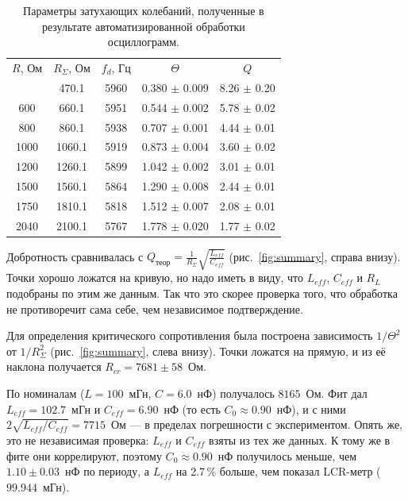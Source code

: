 \documentclass[reprint, amsmath, amssymb, aps, pra, nofootinbib]{revtex4-2}
\begin{document}
\begin{table}[b!]
    \caption{Параметры затухающих колебаний, полученные в результате автоматизированной обработки осциллограмм.}
    \label{tab:auto_results}
    \begin{ruledtabular}
        \begin{tabular}{ccccc}
            $R$, Ом & $R_\Sigma$, Ом & $f_d$, Гц & $\Theta$ & $Q$ \\
            \colrule
            410  & 470.1  & 5960 & 0.380 $\pm$ 0.009 & 8.26 $\pm$ 0.20 \\
            600  & 660.1  & 5951 & 0.544 $\pm$ 0.002 & 5.78 $\pm$ 0.02 \\
            800  & 860.1  & 5938 & 0.707 $\pm$ 0.001 & 4.44 $\pm$ 0.01 \\
            1000 & 1060.1 & 5919 & 0.873 $\pm$ 0.004 & 3.60 $\pm$ 0.02 \\
            1200 & 1260.1 & 5899 & 1.042 $\pm$ 0.002 & 3.01 $\pm$ 0.01 \\
            1500 & 1560.1 & 5864 & 1.290 $\pm$ 0.008 & 2.44 $\pm$ 0.01 \\
            1750 & 1810.1 & 5818 & 1.512 $\pm$ 0.007 & 2.08 $\pm$ 0.01 \\
            2040 & 2100.1 & 5767 & 1.778 $\pm$ 0.020 & 1.77 $\pm$ 0.02 \\
        \end{tabular}
    \end{ruledtabular}
\end{table}

Добротность сравнивалась с $Q_{\text{теор}} = \frac{1}{R_\Sigma}\sqrt{\frac{L_{eff}}{C_{eff}}}$ (рис.~\ref{fig:summary}, справа внизу). Точки хорошо ложатся на кривую, но надо иметь в виду, что $L_{eff}$, $C_{eff}$ и $R_L$ подобраны по этим же данным. Так что это скорее проверка того, что обработка не противоречит сама себе, чем независимое подтверждение.

Для определения критического сопротивления была построена зависимость $1/\Theta^2$ от $1/R_\Sigma^2$ (рис.~\ref{fig:summary}, слева внизу). Точки ложатся на прямую, и из её наклона получается $R_{cr} = 7681 \pm 58$~Ом.

По номиналам ($L = 100$~мГн, $C = 6.0$~нФ) получалось $8165$~Ом. Фит дал $L_{eff} = 102.7$~мГн и $C_{eff} = 6.90$~нФ (то есть $C_0 \approx 0.90$~нФ), и с ними $2\sqrt{L_{eff}/C_{eff}} = 7715$~Ом — в пределах погрешности с экспериментом. Опять же, это не независимая проверка: $L_{eff}$ и $C_{eff}$ взяты из тех же данных. К тому же в фите они коррелируют, поэтому $C_0 \approx 0.90$~нФ получилось меньше, чем $1.10 \pm 0.03$~нФ по периоду, а $L_{eff}$ на 2.7\,\% больше, чем показал LCR-метр ($99.944$~мГн).
\end{document}
